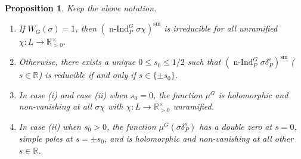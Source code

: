 \documentclass[a4paper]{amsart}
\numberwithin{equation}{section}
\newtheorem{prop}[thm]{Proposition}
\theoremstyle{remark}
\theoremstyle{definition}
\DeclareMathOperator{\nInd}{n-Ind}
\newcommand{\R}{\mathbb{R}}
\newcommand{\sm}{\mathrm{sm}}
\begin{document}
\begin{prop}\label{prop:mu-max-parab}
  Keep the above notation.

  \begin{enumerate}
  \item If $W_{G}(\sigma) = 1$, then $(\nInd_{P}^{G}\sigma\chi)^{\sm}$ is irreducible for all unramified $\chi\colon L\to \R_{>0}^\times$.
  \item Otherwise, there exists a unique $0 \le s_0 \le 1/2$ such that $(\nInd_{P}^{G}\sigma\delta_P^{s})^{\sm}$ ($s \in \R$) is reducible if and only if $s \in \{\pm s_0\}$.
  \item 
    In case (i) and case (ii) when $s_0 = 0$, the function $\mu^{G}$ is holomorphic and non-vanishing at all $\sigma\chi$ with $\chi\colon L\to \R_{>0}^\times$ unramified.
  \item 
    In case (ii) when $s_0 > 0$, the function $\mu^{G}(\sigma\delta_P^s)$ has a double zero at $s = 0$, simple poles at $s = \pm s_0$, and is holomorphic and non-vanishing at all other $s \in \R$.
  \end{enumerate}
\end{prop}
\end{document}
